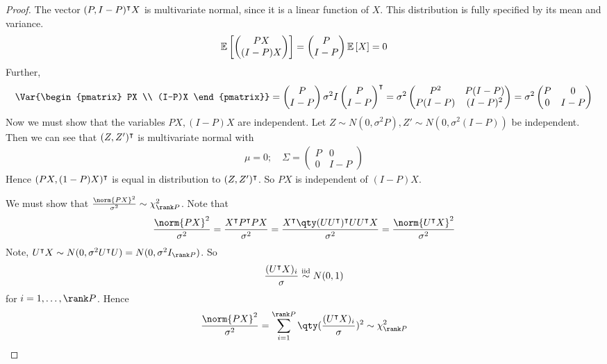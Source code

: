\begin{proof}
	The vector $(P, I-P)^\intercal X$ is multivariate normal, since it is a linear function of $X$.
	This distribution is fully specified by its mean and variance.
	\begin{align*}
		\mathbb{E}\left[{\begin{pmatrix}
				PX \\
				(I-P)X
			\end{pmatrix}}\right] = \begin{pmatrix}
			P \\
			I-P
		\end{pmatrix} \mathbb{E}\left[{X}\right] = 0
	\end{align*}
	Further,
	\begin{align*}
		\Var{\begin{pmatrix}
				PX \\
				(I-P)X
			\end{pmatrix}} = \begin{pmatrix}
			P \\
			I - P
		\end{pmatrix} \sigma^2 I \begin{pmatrix}
			P \\
			I - P
		\end{pmatrix}^\tran = \sigma^2 \begin{pmatrix}
			P^2    & P(I-P)  \\
			P(I-P) & (I-P)^2
		\end{pmatrix} = \sigma^2 \begin{pmatrix}
			P & 0   \\
			0 & I-P
		\end{pmatrix}
	\end{align*}
	Now we must show that the variables $PX, (I-P)X$ are independent.
	Let $Z \sim N(0,\sigma^2 P), Z' \sim N(0,\sigma^2(I-P))$ be independent.
	Then we can see that $(Z, Z')^\intercal$ is multivariate normal with
	\begin{align*}
		\mu = 0;\quad \Sigma = \begin{pmatrix}
			P & 0     \\
			0 & I - P
		\end{pmatrix}
	\end{align*}
	Hence $(PX, (1-P)X)^\intercal$ is equal in distribution to $(Z, Z')^\intercal$.
	So $PX$ is independent of $(I-P)X$.

	We must show that $\frac{\norm{PX}^2}{\sigma^2} \sim \chi^2_{\rank P}$.
	Note that
	\begin{align*}
		\frac{\norm{PX}^2}{\sigma^2} = \frac{X^\tran P^\tran P X}{\sigma^2} = \frac{X^\tran \qty(U U^\tran)^\tran U U^\tran X}{\sigma^2} = \frac{\norm{U^\tran X}^2}{\sigma^2}
	\end{align*}
	Note, $U^\tran X \sim N(0,\sigma^2 U^\tran U) = N(0,\sigma^2 I_{\rank P})$.
	So
	\begin{align*}
		\frac{(U^\intercal X)_i}{\sigma} \overset{\text{iid}}{\sim} N(0,1)
	\end{align*}
	for $i = 1, \dots, \rank P$.
	Hence
	\begin{align*}
		\frac{\norm{PX}^2}{\sigma^2} = \sum_{i=1}^{\rank P} \qty(\frac{(U^\tran X)_i}{\sigma})^2 \sim \chi^2_{\rank P}
	\end{align*}
\end{proof}
